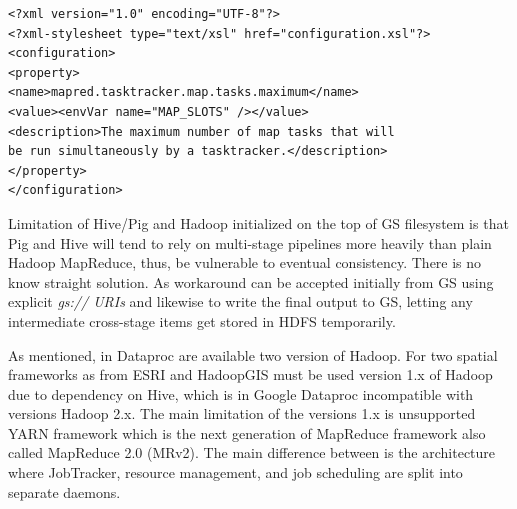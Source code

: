 \documentclass[a4paper,12pt,oneside]{report}
\begin{document}
	\begin{footnotesize}
		\begin{lstlisting}[style=XML]
<?xml version="1.0" encoding="UTF-8"?>
<?xml-stylesheet type="text/xsl" href="configuration.xsl"?>
<configuration>
<property>
<name>mapred.tasktracker.map.tasks.maximum</name>
<value><envVar name="MAP_SLOTS" /></value>
<description>The maximum number of map tasks that will 
be run simultaneously by a tasktracker.</description>
</property>
</configuration>
		\end{lstlisting}
	\end{footnotesize}
	
    Limitation of Hive/Pig and Hadoop initialized  on the top of GS filesystem is that Pig and Hive 
    will tend to rely on multi-stage pipelines more heavily than plain Hadoop MapReduce,  thus,
    be vulnerable to eventual  consistency. There is no know straight solution.
    As workaround can be accepted initially from GS using explicit \textit{gs:// URIs } and likewise 
    to write the final output to    GS,     letting any intermediate cross-stage items get stored in 
    HDFS temporarily.
    
    
    As mentioned, in Dataproc are available two version of Hadoop. For two spatial
    frameworks as from ESRI and HadoopGIS must be used version 1.x of Hadoop due to 
    dependency on Hive, which is in Google  Dataproc incompatible with versions Hadoop 2.x. 
    The main limitation of the versions 1.x is unsupported  YARN framework which is the 
    next generation of MapReduce framework also called MapReduce 2.0 (MRv2)\cite{yarn}.  
    The main difference between is the architecture where JobTracker, resource     management, 
    and job scheduling are split into separate daemons.
    
   
    
\end{document}
